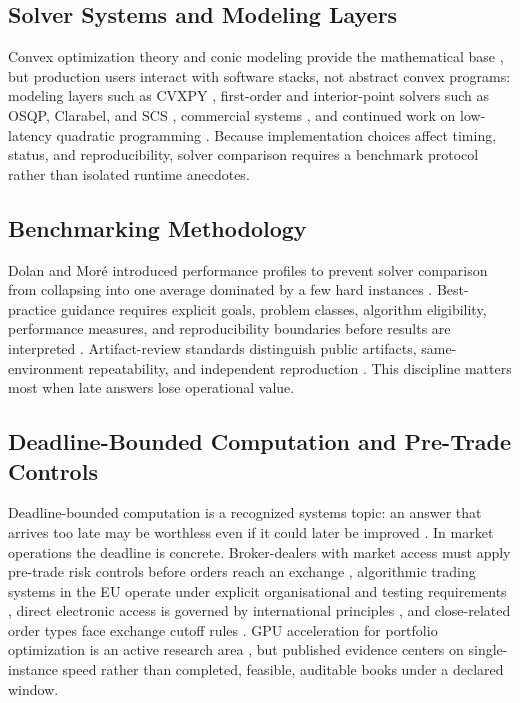 \documentclass[10pt,a4paper]{extarticle}
\begin{document}
\subsection{Solver Systems and Modeling Layers}

Convex optimization theory and conic modeling provide the mathematical base
\citep{boydvandenberghe2004,lobo2000applications}, but production users
interact with software stacks, not abstract convex programs: modeling layers
such as CVXPY \citep{cvxpy2016}, first-order and interior-point solvers such as
OSQP, Clarabel, and SCS \citep{osqp,clarabel2024,scs2016}, commercial systems
\citep{mosek2026}, and continued work on low-latency quadratic programming
\citep{proxqp2025,highs2020}. Because implementation choices affect timing,
status, and reproducibility, solver comparison requires a benchmark protocol
rather than isolated runtime anecdotes.

\subsection{Benchmarking Methodology}

Dolan and Mor\'{e} introduced performance profiles to prevent solver comparison
from collapsing into one average dominated by a few hard instances
\citep{dolanmore2002}. Best-practice guidance requires explicit goals, problem
classes, algorithm eligibility, performance measures, and reproducibility
boundaries before results are interpreted \citep{bartz2020benchmarking}.
Artifact-review standards distinguish public artifacts, same-environment
repeatability, and independent reproduction \citep{acmartifact2020}. This
discipline matters most when late answers lose operational value.

\subsection{Deadline-Bounded Computation and Pre-Trade Controls}

Deadline-bounded computation is a recognized systems topic: an answer that
arrives too late may be worthless even if it could later be improved
\citep{zilberstein1996using}. In market operations the deadline is concrete.
Broker-dealers with market access must apply pre-trade risk controls before
orders reach an exchange \citep{sec15c35}, algorithmic trading systems in the
EU operate under explicit organisational and testing requirements
\citep{esmarts6}, direct electronic access is governed by international
principles \citep{iosco2010dea}, and close-related order types face exchange
cutoff rules \citep{nasdaqclose}. GPU acceleration for portfolio optimization
is an active research area
\citep{flashfolio2026,niu2026scalable,nvidia_cuopt}, but published evidence
centers on single-instance speed rather than completed, feasible, auditable
books under a declared window.
\end{document}
